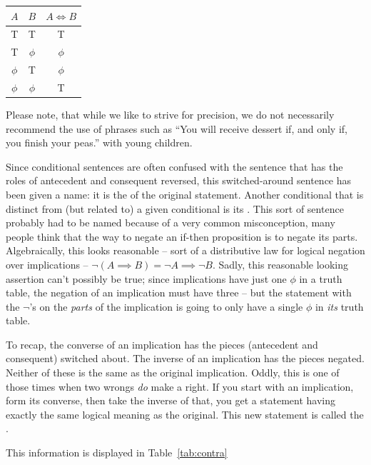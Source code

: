 \begin{center}
\begin{tabular}{c|c||c}
\; $A$ \; & \; $B$ \; & \; $A \iff B$ \; \\ \hline
T & T & T \\
T & $\phi$ & $\phi$\\
 $\phi$ & T & $\phi$ \\
 $\phi$ &  $\phi$ & T\\
\end{tabular}
\end{center}

Please note, that while we like to strive for precision, we do not
necessarily recommend the use of phrases such as 
``You will receive dessert if, and only if,
you finish your peas.'' with young children.


Since conditional sentences are often confused with the sentence
that has the roles of antecedent and consequent reversed, this
switched-around sentence has been given a name: it is the 
of the original statement.  Another conditional that is distinct from 
(but related to) a given conditional is its .  
This sort of sentence probably had to be named because of a very common 
misconception, many people think that the way to negate an if-then 
proposition is to negate
its parts.  Algebraically, this looks reasonable -- sort of a distributive
law for logical negation over implications -- ${\lnot}( A \implies B) =
{\lnot}A \implies {\lnot}B$.  Sadly, this reasonable looking assertion
can't possibly be true; since implications have just one $\phi$ in a truth 
table, the negation of an implication  must have three -- but the statement 
with the $\lnot$'s on the {\em parts} of the implication is going to only have 
a single $\phi$ in {\em its} truth table.

To recap, the converse of an implication has the pieces (antecedent and 
consequent) switched about.  The inverse of an implication has the 
pieces negated.  Neither of these is the same as the original implication.
Oddly, this is one of those times when two wrongs {\em do} make a right.
If you start with an implication, form its converse, then take the inverse
of that, you get a statement having exactly the same logical meaning
as the original.  This new statement is called the 
.

This information is displayed in Table~\ref{tab:contra} 

